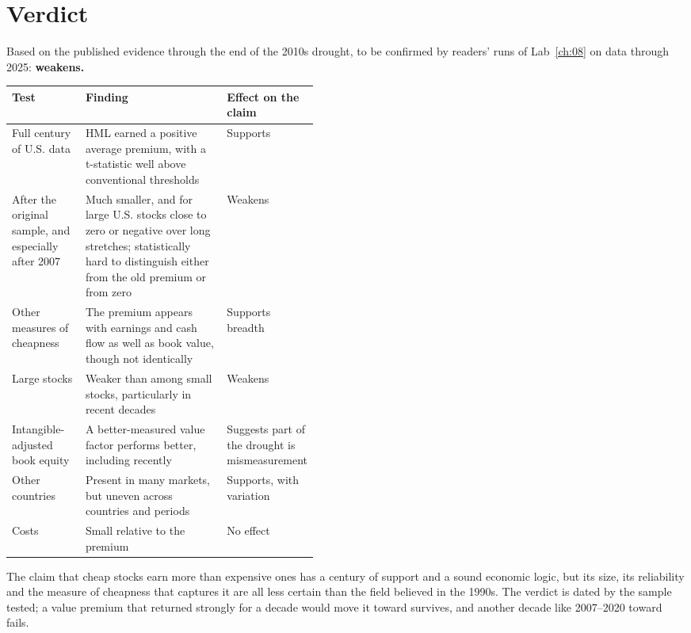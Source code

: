 \section{Verdict}
\label{sec:08-verdict}

Based on the published evidence through the end of the 2010s drought, to be confirmed by readers' runs of Lab~\ref{ch:08} on data through 2025: \textbf{weakens.}

\begin{center}
\small
\begin{tabularx}{0.9\linewidth}{@{}>{\raggedright\arraybackslash}p{0.24\linewidth}>{\raggedright\arraybackslash}X>{\raggedright\arraybackslash}p{0.21\linewidth}@{}}
\toprule
Test & Finding & Effect on the claim \\
\midrule
Full century of U.S. data & HML earned a positive average premium, with a t-statistic well above conventional thresholds & Supports \\
After the original sample, and especially after 2007 & Much smaller, and for large U.S. stocks close to zero or negative over long stretches; statistically hard to distinguish either from the old premium or from zero & Weakens \\
Other measures of cheapness & The premium appears with earnings and cash flow as well as book value, though not identically & Supports breadth \\
Large stocks & Weaker than among small stocks, particularly in recent decades & Weakens \\
Intangible-adjusted book equity & A better-measured value factor performs better, including recently & Suggests part of the drought is mismeasurement \\
Other countries & Present in many markets, but uneven across countries and periods & Supports, with variation \\
Costs & Small relative to the premium & No effect \\
\bottomrule
\end{tabularx}
\end{center}

The claim that cheap stocks earn more than expensive ones has a century of support and a sound economic logic, but its size, its reliability and the measure of cheapness that captures it are all less certain than the field believed in the 1990s. The verdict is dated by the sample tested; a value premium that returned strongly for a decade would move it toward survives, and another decade like 2007--2020 toward fails.

